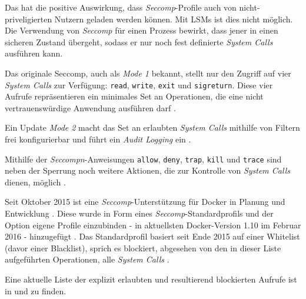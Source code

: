 \documentclass[../main.tex]{subfiles}
\begin{document}
			Das hat die positive Auswirkung, dass \emph{Seccomp}-Profile auch von nicht-priveligierten Nutzern geladen werden können. Mit LSMs ist dies nicht möglich.
			Die Verwendung von \emph{Seccomp} für einen Prozess bewirkt, dass jener in einen \glqq{}sicheren\grqq{} Zustand übergeht, sodass er nur noch fest definierte \emph{System Calls} ausführen kann.



			Das originale Seccomp, auch als \emph{Mode 1} bekannt, stellt nur den Zugriff auf vier \emph{System Calls} zur Verfügung: \texttt{read}, \texttt{write}, \texttt{exit} und \texttt{sigreturn}. Diese vier Aufrufe repräsentieren ein minimales Set an Operationen, die eine nicht vertrauenswürdige Anwendung ausführen darf \cite{linuxSecOverview}.

			Ein Update \emph{Mode 2} macht das Set an erlaubten \emph{System Calls} mithilfe von Filtern frei konfigurierbar und führt ein \emph{Audit Logging} ein	\cite{linuxSecOverview}\cite{seccompGitDesc}.

			Mithilfe der \emph{Seccompn}-Anweisungen \texttt{allow}, \texttt{deny}, \texttt{trap}, \texttt{kill} und \texttt{trace} sind neben der Sperrung noch weitere Aktionen, die zur Kontrolle von \emph{System Calls} dienen, möglich \cite{docker110Security}.

			Seit Oktober 2015 ist eine \emph{Seccomp}-Unterstützung für Docker in Planung und Entwicklung \cite{githubGeneralSecProfiles}\cite{githubSeccompIntegration}. Diese wurde in Form eines \emph{Seccomp}-Standardprofils und der Option eigene Profile einzubinden - in aktuellsten Docker-Version 1.10 im Februar 2016 - hinzugefügt \cite{githubDockerChangelog}\cite{githubSeccompDoc}\cite{githubSeccompProfile}\cite{docker110Security}. Das Standardprofil basiert seit Ende 2015 auf einer Whitelist (davor einer Blacklist), sprich es blockiert, abgesehen von den in dieser Liste aufgeführten Operationen, alle \emph{System Calls} \cite{githubSeccompDoc}.

			Eine aktuelle Liste der explizit erlaubten und resultierend blockierten Aufrufe ist in \cite{githubSeccompProfile} und \cite{githubSeccompDoc} zu finden.
\end{document}
